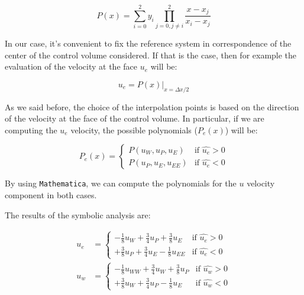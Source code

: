 \begin{equation}
    P(x) = \sum_{i=0}^{2} y_i \prod_{j=0, j \neq i}^{2} \frac{x - x_j}{x_i - x_j}
    \label{eq:langrange_interpolation_polynomial}
\end{equation}

In our case, it's convenient to fix the reference system in correspondence of the center of the control volume considered.
If that is the case, then for example the evaluation of the velocity at the face $u_e$ will be:

\begin{equation}
    u_e = P(x) \bigg|_{x = \Delta x/2}
\end{equation}

As we said before, the choice of the interpolation points is based on the direction of the velocity at the face of the control volume.
In particular, if we are computing the $u_e$ velocity, the possible polynomials ($P_e(x)$) will be:

\begin{equation}
    P_e(x) = \begin{cases}
        P(u_W, u_P, u_E)    & \text{if } \hat{u_e} > 0 \\
        P(u_P, u_E, u_{EE}) & \text{if } \hat{u_e} < 0
    \end{cases}
\end{equation}

By using \texttt{Mathematica}, we can compute the polynomials for the $u$ velocity component in both cases.

The results of the symbolic analysis are:

\begin{align}
    u_e & = \begin{cases}
                -\frac{1}{8} u_W + \frac{3}{4} u_P + \frac{3}{8} u_E    & \text{if } \hat{u_e} > 0 \\
                +\frac{3}{8} u_P + \frac{3}{4} u_E - \frac{1}{8} u_{EE} & \text{if } \hat{u_e} < 0
            \end{cases}    \\
    u_w & = \begin{cases}
                -\frac{1}{8} u_{WW} +    \frac{3}{4} u_W + \frac{3}{8} u_P & \text{if } \hat{u_w} > 0 \\
                +\frac{3}{8} u_W + \frac{3}{4} u_P - \frac{1}{8} u_E       & \text{if } \hat{u_w} < 0
            \end{cases}
\end{align}

